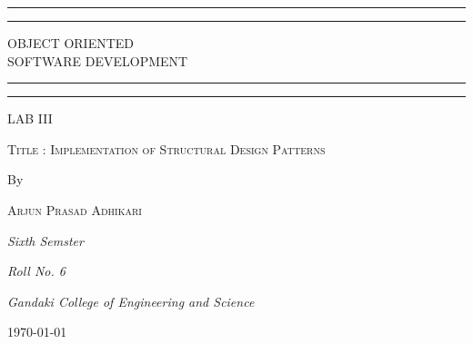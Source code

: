 \begin{titlepage}
\centering %

\scshape %

\vspace*{\baselineskip} %

\rule{\textwidth}{1.6pt}\vspace*{-\baselineskip}\vspace*{2pt} %
\rule{\textwidth}{0.4pt} %

\vspace{0.75\baselineskip} %

{\LARGE OBJECT ORIENTED \\ \vspace{0.75\baselineskip}SOFTWARE DEVELOPMENT} %

\vspace{0.75\baselineskip} %

\rule{\textwidth}{0.4pt}\vspace*{-\baselineskip}\vspace{3.2pt} %
\rule{\textwidth}{1.6pt} %

\vfill

{\LARGE LAB III }

\vspace{0.5\baselineskip} 

{\scshape\Large Title : Implementation of Structural Design Patterns \\} 

\vfill

By

\vspace{0.5\baselineskip} 

{\scshape\Large Arjun Prasad Adhikari \\} 
\vspace{0.5\baselineskip} %

\textit{Sixth Semster} %
\vspace{0.5\baselineskip}

\textit{Roll No. 6} %
\vfill %

\textit{Gandaki College of Engineering and Science} 
\vspace{1\baselineskip}

\today %


\end{titlepage}